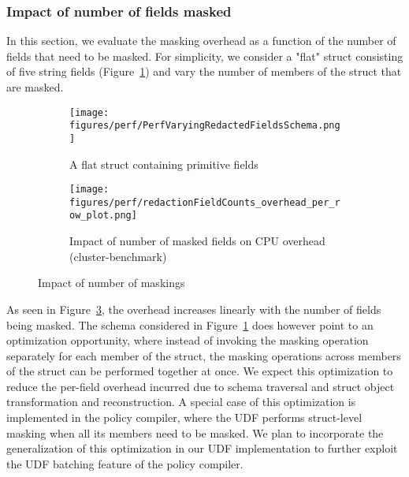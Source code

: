 \subsubsection{Impact of number of fields masked} 
In this section, we evaluate the masking overhead as a function of the number
of fields that need to be masked. For simplicity, we consider a "flat" struct consisting of five string
fields (Figure~\ref{fig:PerfVaryingRedactedFieldsSchema}) and vary the number of members of the struct that are masked. 
\begin{figure}[ht]  %
    \vspace{-1em}
   \begin{subfigure}[b]{0.45\columnwidth}
    \texttt{[image: figures/perf/PerfVaryingRedactedFieldsSchema.png]}
    \caption{A flat struct containing primitive fields}  %
    \label{fig:PerfVaryingRedactedFieldsSchema}  %
\end{subfigure}
\begin{subfigure}[b]{0.45\columnwidth}  %
    \texttt{[image: figures/perf/redactionFieldCounts\_overhead\_per\_row\_plot.png]}
    \caption{Impact of number of masked fields on CPU overhead (cluster-benchmark)}  %
    \label{fig:PerfVaryingRedactedFieldsResult}  %
    \end{subfigure}
    \vspace{-1em}
    \caption{Impact of number of maskings}
    \vspace{-2em}
\end{figure}
As seen in Figure~\ref{fig:PerfVaryingRedactedFieldsResult}, the overhead increases linearly with the number of fields being
masked. The schema considered in Figure~\ref{fig:PerfVaryingRedactedFieldsSchema} does however point to an optimization opportunity, 
where instead of invoking the masking operation separately for each member of the struct, 
the masking operations across members of the struct can be performed together at once. 
We expect this optimization to reduce the per-field overhead incurred due to schema traversal and struct object transformation and reconstruction.
A special case of this optimization is implemented in the policy compiler, where the UDF performs struct-level masking when all its members need to be masked. 
We plan to incorporate the generalization of this optimization in our UDF implementation to further exploit the UDF batching feature of the policy compiler. \\

